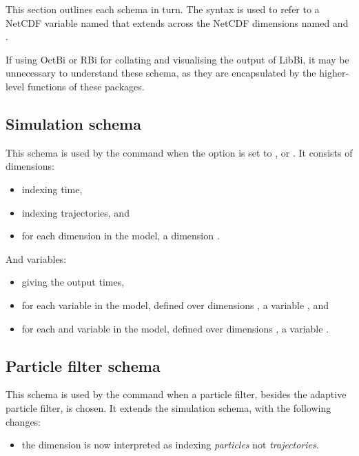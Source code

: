 This section outlines each schema in turn. The syntax  is used to
refer to a NetCDF variable named  that extends across the NetCDF
dimensions named  and .

\begin{tip}
If using OctBi or RBi for collating and visualising the output of LibBi, it
may be unnecessary to understand these schema, as they are encapsulated by
the higher-level functions of these packages.
\end{tip}

\subsection{Simulation schema\label{Simulation schema}}

This schema is used by the  command when the 
option is set to ,  or . It consists
of dimensions:
\begin{itemize}
\item {} indexing time,
\item {} indexing trajectories, and
\item for each dimension  in the model, a dimension
  .
\end{itemize}
And variables:
\begin{itemize}
\item {} giving the output times,
\item for each  variable  in the model,
  defined over dimensions , a variable
  , and
\item for each  and  variable  in the
  model, defined over dimensions , a variable
  .
\end{itemize}

\subsection{Particle filter schema}

This schema is used by the  command when a particle filter,
besides the adaptive particle filter, is chosen. It extends the simulation
schema, with the following changes:
\begin{itemize}
\item the  dimension is now interpreted as indexing \emph{particles}
  not \emph{trajectories}.
\end{itemize}

